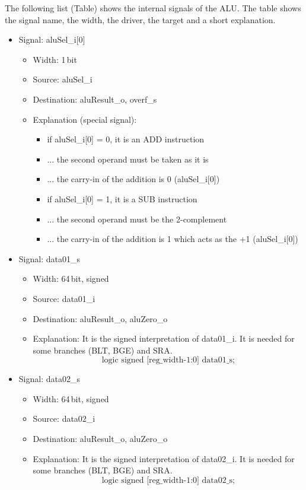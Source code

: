 The following list (Table) shows the internal signals of the ALU. The table shows the signal name, the width, the driver, the target and a short explanation.
\begin{itemize}
  \item Signal: aluSel\_i[0]
  \begin{itemize}
    \item Width: 1\,bit
    \item Source: aluSel\_i
    \item Destination: aluResult\_o, overf\_s
    \item Explanation (special signal): 
    \begin{itemize}
      \item if aluSel\_i[0] = 0, it is an ADD instruction
      \item ... the second operand must be taken as it is
      \item ... the carry-in of the addition is 0 (aluSel\_i[0])
      \item if aluSel\_i[0] = 1, it is a SUB instruction
      \item ... the second operand must be the 2-complement
      \item ... the carry-in of the addition is 1 which acts as the +1 (aluSel\_i[0])
    \end{itemize}
  \end{itemize}
  \item Signal: data01\_s
  \begin{itemize}
    \item Width: 64\,bit, signed
    \item Source: data01\_i
    \item Destination: aluResult\_o, aluZero\_o
    \item Explanation: It is the signed interpretation of data01\_i. It is needed for some branches (BLT, BGE) and SRA.\[ \mbox{logic signed [reg\_width-1:0] data01\_s;} \]
  \end{itemize}
  \item Signal: data02\_s
  \begin{itemize}
    \item Width: 64\,bit, signed
    \item Source: data02\_i
    \item Destination: aluResult\_o, aluZero\_o
    \item Explanation: It is the signed interpretation of data02\_i. It is needed for some branches  (BLT, BGE) and SRA.\[ \mbox{logic signed [reg\_width-1:0] data02\_s;} \]

\end{itemize}
\end{itemize}

